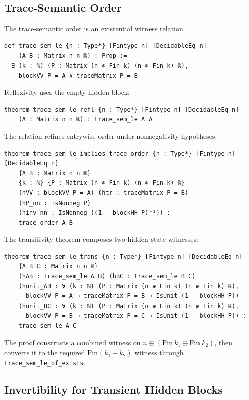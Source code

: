 \documentclass[11pt]{article}
\begin{document}
\subsection{Trace-Semantic Order}

The trace-semantic order is an existential witness relation.
\begin{lstlisting}[style=lean]
def trace_sem_le {n : Type*} [Fintype n] [DecidableEq n]
    (A B : Matrix n n ℝ) : Prop :=
  ∃ (k : ℕ) (P : Matrix (n ⊕ Fin k) (n ⊕ Fin k) ℝ),
    blockVV P = A ∧ traceMatrix P = B
\end{lstlisting}
Reflexivity uses the empty hidden block:
\begin{lstlisting}[style=lean]
theorem trace_sem_le_refl {n : Type*} [Fintype n] [DecidableEq n]
    (A : Matrix n n ℝ) : trace_sem_le A A
\end{lstlisting}
The relation refines entrywise order under nonnegativity hypotheses:
\begin{lstlisting}[style=lean]
theorem trace_sem_le_implies_trace_order {n : Type*} [Fintype n] [DecidableEq n]
    {A B : Matrix n n ℝ}
    {k : ℕ} {P : Matrix (n ⊕ Fin k) (n ⊕ Fin k) ℝ}
    (hVV : blockVV P = A) (htr : traceMatrix P = B)
    (hP_nn : IsNonneg P)
    (hinv_nn : IsNonneg ((1 - blockHH P)⁻¹)) :
    trace_order A B
\end{lstlisting}
The transitivity theorem composes two hidden-state witnesses:
\begin{lstlisting}[style=lean]
theorem trace_sem_le_trans {n : Type*} [Fintype n] [DecidableEq n]
    {A B C : Matrix n n ℝ}
    (hAB : trace_sem_le A B) (hBC : trace_sem_le B C)
    (hunit_AB : ∀ (k : ℕ) (P : Matrix (n ⊕ Fin k) (n ⊕ Fin k) ℝ),
      blockVV P = A → traceMatrix P = B → IsUnit (1 - blockHH P))
    (hunit_BC : ∀ (k : ℕ) (P : Matrix (n ⊕ Fin k) (n ⊕ Fin k) ℝ),
      blockVV P = B → traceMatrix P = C → IsUnit (1 - blockHH P)) :
    trace_sem_le A C
\end{lstlisting}
The proof constructs a combined witness on \(n \oplus (\mathrm{Fin}\ k_1 \oplus \mathrm{Fin}\ k_2)\), then converts it to the required \(\mathrm{Fin}(k_1+k_2)\) witness through \texttt{trace_sem_le_of_exists}.

\subsection{Invertibility for Transient Hidden Blocks}
\end{document}
